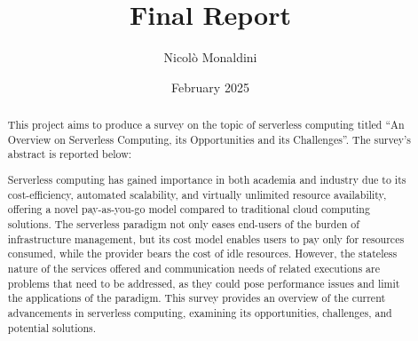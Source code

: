 \documentclass{scrartcl}
\title{\LARGE
    Final Report
}
\author{
    Nicolò Monaldini \\ \emailaddr{nicolo.monaldini@studio.unibo.it}
}
\date{February 2025}
\begin{document}
\maketitle

\begin{abstract}
    This project aims to produce a survey on the topic of serverless computing titled ``An Overview on Serverless Computing, its Opportunities and its Challenges''. The survey's abstract is reported below: 
    
    Serverless computing has gained importance in both academia and industry due to its cost-efficiency, automated scalability, and virtually unlimited resource availability, offering a novel pay-as-you-go model compared to traditional cloud computing solutions. The serverless paradigm not only eases end-users of the burden of infrastructure management, but its cost model enables users to pay only for resources consumed, while the provider bears the cost of idle resources. However, the stateless nature of the services offered and communication needs of related executions are problems that need to be addressed, as they could pose performance issues and limit the applications of the paradigm. This survey provides an overview of the current advancements in serverless computing, examining its opportunities, challenges, and potential solutions. 
\end{abstract}






\end{document}
